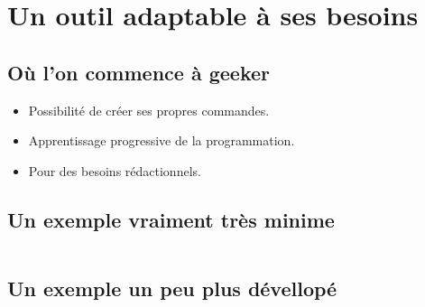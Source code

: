 \section[Adapter]{Un outil adaptable à ses besoins}

\subsection{Où l'on commence à geeker}

\begin{frame}
  \begin{itemize}
    \item Possibilité de créer ses propres commandes.
    \item Apprentissage progressive de la programmation.
    \item Pour des besoins rédactionnels.
  \end{itemize}
\end{frame}

\subsection{Un exemple vraiment très minime}
\begin{frame}
  \renewcommand{\index}[2][]{}
  \beamerdefaultoverlayspecification{}
  \inputminted{latex}{examples/prog.tex}
  
\end{frame}

\subsection{Un exemple un peu plus dévellopé}
\begin{frame}
  \renewcommand{\index}[2][]{}
  \beamerdefaultoverlayspecification{}
  \inputminted{latex}{examples/prog2.tex}
  
\end{frame}

